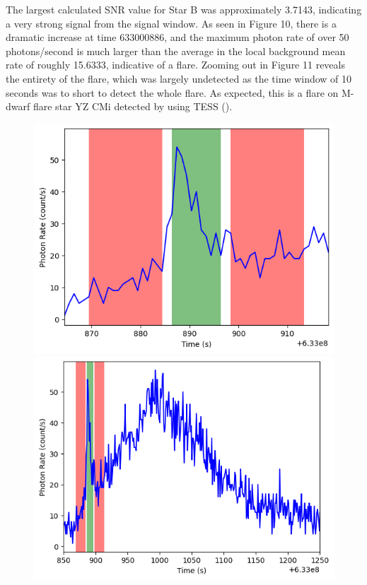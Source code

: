 \documentclass{article}
\begin{document}
\begin{multicols}{2}

The largest calculated SNR value for Star B was approximately 3.7143, indicating a very strong signal from the signal window. As seen in Figure 10, there is a dramatic increase at time 633000886, and the maximum photon rate of over 50 photons/second is much larger than the average in the local background mean rate of roughly 15.6333, indicative of a flare. Zooming out in Figure 11 reveals the entirety of the flare, which was largely undetected as the time window of 10 seconds was to short to detect the whole flare. As expected, this is a flare on M-dwarf flare star YZ CMi detected by \citeauthor{paudel} using TESS (\citeyear{paudel}). 

\end{multicols}
\newpage
\begin{figure}[hp]
  \begin{minipage}[b]{.45\linewidth} 
    \centering
    \includegraphics[scale=0.5]{109_ts_peak.png}
  \end{minipage}\hfill
  \begin{minipage}[b]{.45\linewidth}
    \centering
    \includegraphics[scale=0.5]{109_ts_zoomout.png}

\end{minipage}
\end{figure}
\end{document}
